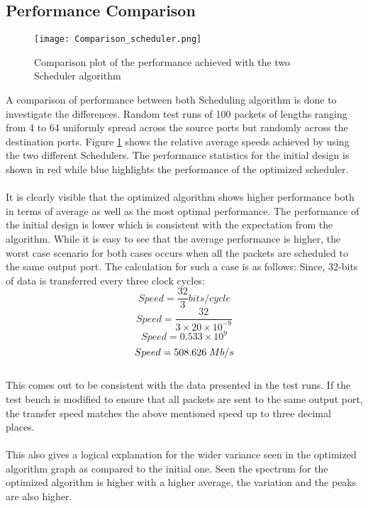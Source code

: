 \documentclass[twoside,12pt,fleqn]{book} %
\begin{document}
\subsection{Performance Comparison}
\begin{figure}[ht]
    \centering
    \texttt{[image: Comparison\_scheduler.png]}
    \caption{Comparison plot of the performance achieved with the two Scheduler algorithm}
    \label{fig:comparison}
\end{figure}
A comparison of performance between both Scheduling algorithm is done to investigate the differences. Random test runs of 100 packets of lengths ranging from 4 to 64 uniformly spread across the source ports but randomly across the destination ports. Figure \ref{fig:comparison} shows the relative average speeds achieved by using the two different Schedulers. The performance statistics for the initial design is shown in red while blue highlights the performance of the optimized scheduler.\\\\
It is clearly visible that the optimized algorithm shows higher performance both in terms of average as well as the most optimal performance. The performance of the initial design is lower which is consistent with the expectation from the algorithm. While it is easy to see that the average performance is higher, the worst case scenario for both cases occurs when all the packets are scheduled to the same output port. The calculation for such a case is as follows:
Since, 32-bits of data is transferred every three clock cycles:
$$ Speed = \dfrac{32}{3} bits/cycle$$
$$ Speed = \dfrac{32}{3\times20\times10^{-9}}$$
$$ Speed = 0.533\times10^{9}$$
$$ Speed = 508.626 \hspace{1mm} Mb/s $$\\
This comes out to be consistent with the data presented in the test runs. If the test bench is modified to ensure that all packets are sent to the same output port, the transfer speed matches the above mentioned speed up to three decimal places.\\\\
This also gives a logical explanation for the wider variance seen in the optimized algorithm graph as compared to the initial one. Seen the spectrum for the optimized algorithm is higher with a higher average, the variation and the peaks are also higher.
\end{document}
